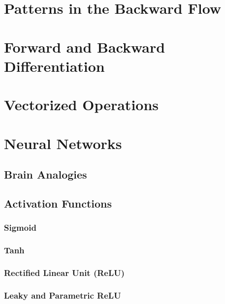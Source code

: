 	\section{Patterns in the Backward Flow} %

	\section{Forward and Backward Differentiation} %

	\section{Vectorized Operations} %

	\section{Neural Networks} %

		\subsection{Brain Analogies} %

		\subsection{Activation Functions} %

			\subsubsection{Sigmoid} %

			\subsubsection{Tanh} %

			\subsubsection{Rectified Linear Unit (ReLU)} %

			\subsubsection{Leaky and Parametric ReLU} %

